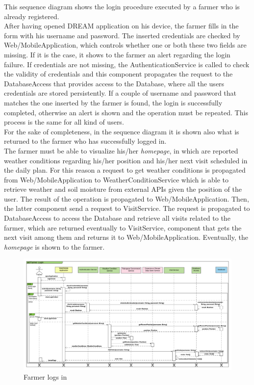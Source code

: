 This sequence diagram shows the login procedure executed by a farmer who is already registered.\\
After having opened DREAM application on his device, the farmer fills in the form with his username and password. The inserted credentials are checked by Web/MobileApplication, which controls whether one or both these two fields are missing. If it is the case, it shows to the farmer an alert regarding the login failure. If credentials are not missing, the AuthenticationService is called to check the validity of credentials and this component propagates the request to the DatabaseAccess that provides access to the Database, where all the users credentials are stored persistently. If a couple of username and password that matches the one inserted by the farmer is found, the login is successfully completed, otherwise an alert is shown and the operation must be repeated. This process is the same for all kind of users. \\
For the sake of completeness, in the sequence diagram it is shown also what is returned to the farmer who has successfully logged in. \\ 
The farmer must be able to visualize his/her \textit{homepage}, in which are reported weather conditions regarding his/her position and his/her next visit scheduled in the daily plan. For this reason a request to get weather conditions is propagated from Web/MobileApplication to WeatherConditionService which is able to retrieve weather and soil moisture from external APIs given the position of the user. The result of the operation is propagated to Web/MobileApplication. Then, the latter component send a request to VisitService. The request is propagated to DatabaseAccess to access the Database and retrieve all visits related to the farmer, which are returned eventually to VisitService, component that gets the next visit among them and returns it to Web/MobileApplication. Eventually, the \textit{homepage} is shown to the farmer. 

\newpage
\begin{landscape}
\begin{figure}[h]
\vspace*{-2cm}
\noindent
\centering
\centerline{\includegraphics[scale= 0.108]{./Images/Sequence diagram/Farmer Login Sequence Diagram.png}}
    \caption{Farmer logs in}
    \vspace*{-12cm}
\end{figure}
\fillandplacepagenumber
\end{landscape}

